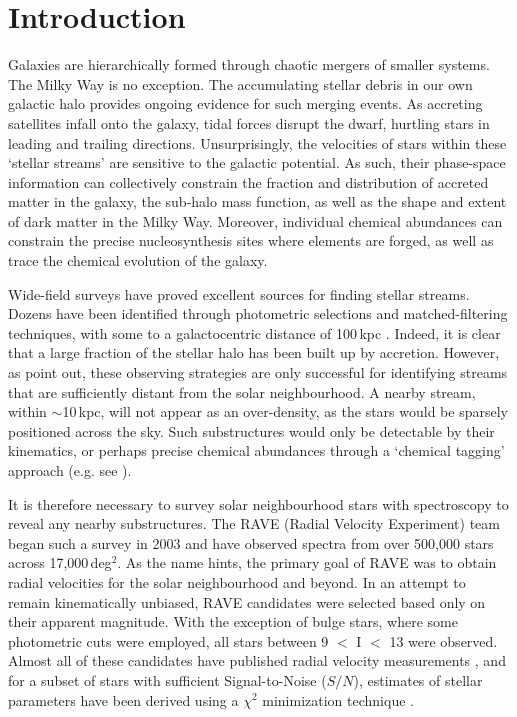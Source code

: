 \documentclass{emulateapj}
\begin{document}

\section{Introduction}
Galaxies are hierarchically formed through chaotic mergers of smaller systems. The Milky Way is no exception. The accumulating stellar debris in our own galactic halo provides ongoing evidence for such merging events. As accreting satellites infall onto the galaxy, tidal forces disrupt the dwarf, hurtling stars in leading and trailing directions. Unsurprisingly, the velocities of stars within these `stellar streams' are sensitive to the galactic potential. As such, their phase-space information can collectively constrain the fraction and distribution of accreted matter in the galaxy, the sub-halo mass function, as well as the shape and extent of dark matter in the Milky Way. Moreover, individual chemical abundances can constrain the  precise nucleosynthesis sites where elements are forged, as well as trace the chemical evolution of the galaxy.


Wide-field surveys have proved excellent sources for finding stellar streams. Dozens have been identified through photometric selections and matched-filtering techniques, with some to a galactocentric distance of 100\,kpc \citep{belokurov;et-al_2007,drake;et-al_2013}. Indeed, it is clear that a large fraction of the stellar halo has been built up by accretion. However, as \citet{helmi;white_1999} point out, these observing strategies are only successful for identifying streams that are sufficiently distant from the solar neighbourhood. A nearby stream, within $\sim$10\,kpc, will not appear as an over-density, as the stars would be sparsely positioned across the sky. Such substructures would only be detectable by their kinematics, or perhaps precise chemical abundances through a `chemical tagging' approach (e.g. see \citet{freeman;bland-hawthorn_2002}). 

It is therefore necessary to survey solar neighbourhood stars with spectroscopy to reveal any nearby substructures. The RAVE (Radial Velocity Experiment) team began such a survey in 2003 and have observed spectra from over 500,000 stars across 17,000\,deg$^{2}$. As the name hints, the primary goal of RAVE was to obtain radial velocities for the solar neighbourhood and beyond. In an attempt to remain kinematically unbiased, RAVE candidates were selected based only on their apparent magnitude. With the exception of bulge stars, where some photometric cuts were employed, all stars between 9 $<$ I $<$ 13 were observed. Almost all of these candidates have published radial velocity measurements \citep{steinmetz;et-al_2006}, and for a subset of stars with sufficient Signal-to-Noise ($S/N$), estimates of stellar parameters have been derived using a $\chi^2$ minimization technique \citep{zwitter;et-al_2008, siebert;et-al_2011}. 
\end{document}
